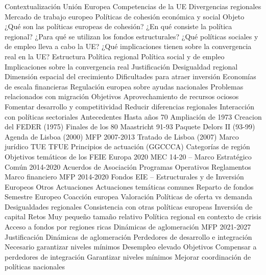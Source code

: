 \documentclass{nuevotema}
\begin{document}
\begin{esquema}[enumerate]
	\1[] 
		\2 Contextualización
			\3 Unión Europea
			\3 Competencias de la UE
			\3 Divergencias regionales
			\3 Mercado de trabajo europeo
			\3 Políticas de cohesión económica y social
		\2 Objeto
			\3 ¿Qué son las políticas europeas de cohesión?
			\3 ¿En qué consiste la política regional?
			\3 ¿Para qué se utilizan los fondos estructurales?
			\3 ¿Qué políticas sociales y de empleo lleva a cabo la UE?
			\3 ¿Qué implicaciones tienen sobre la convergencia real en la UE?
		\2 Estructura
			\3 Política regional
			\3 Política social y de empleo
			\3 Implicaciones sobre la convergencia real
	\1 
		\2 Justificación
			\3 Desigualdad regional
			\3 Dimensión espacial del crecimiento
			\3 Dificultades para atraer inversión
			\3 Economías de escala financieras
			\3 Regulación europea sobre ayudas nacionales
			\3 Problemas relacionados con migración
		\2 Objetivos
			\3 Aprovechamiento de recursos ociosos
			\3 Fomentar desarrollo y competitividad
			\3 Reducir diferencias regionales
			\3 Interacción con políticas sectoriales
		\2 Antecedentes
			\3 Hasta años 70
			\3 Ampliación de 1973
			\3 Creacion del FEDER (1975)
			\3 Finales de los 80
			\3 Maastricht 91-93
			\3 Paquete Delors II (93-99)
			\3 Agenda de Lisboa (2000)
			\3 MFP 2007-2013
			\3 Tratado de Lisboa (2007)
		\2 Marco jurídico
			\3 TUE
			\3 TFUE
			\3 Principios de actuación (GGCCCA)
			\3 Categorías de región
			\3 Objetivos temáticos de los FEIE
			\3 Europa 2020
			\3 MEC 14-20 -- Marco Estratégico Común 2014-2020
			\3 Acuerdos de Asociación
			\3 Programas Operativos
			\3 Reglamentos
		\2 Marco financiero
			\3 MFP 2014-2020
			\3 Fondos EIE -- Estructurales y de Inversión Europeos
			\3 Otros
		\2 Actuaciones
			\3 Actuaciones temáticas comunes
			\3 Reparto de fondos
			\3 Semestre Europeo
			\3 Coacción europea
		\2 Valoración
			\3 Políticas de oferta vs demanda
			\3 Desigualdades regionales
			\3 Consistencia con otras políticas europeas
			\3 Inversión de capital
		\2 Retos
			\3 Muy pequeño tamaño relativo
			\3 Política regional en contexto de crisis
			\3 Acceso a fondos por regiones ricas
			\3 Dinámicas de aglomeración
			\3 MFP 2021-2027
	\1 
		\2 Justificación
			\3 Dinámicas de aglomeración
			\3 Perdedores de desarrollo e integración
			\3 Necesario garantizar niveles mínimos
			\3 Desempleo elevado
		\2 Objetivos
			\3 Compensar a perdedores de integración
			\3 Garantizar niveles mínimos
			\3 Mejorar coordinación de políticas nacionales

\end{esquema}
\end{document}
